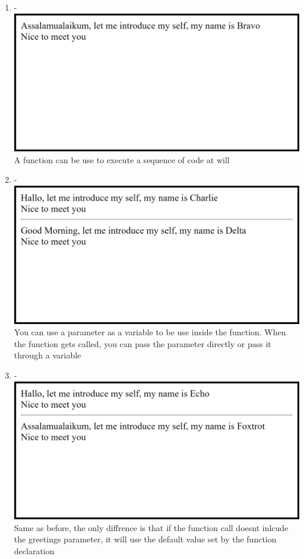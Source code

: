 \documentclass[12pt,titlepage]{article}
\begin{document}
\begin{enumerate}
    \item - \\ \includegraphics[width=.9\textwidth]{images/figures/fig4.png} \\ A function can be use to execute a sequence of code at will
    \item - \\ \includegraphics[width=.9\textwidth]{images/figures/fig5.png} \\ You can use a parameter as a variable to be use inside the function. When the function gets called, you can pass the parameter directly or pass it through a variable
    
    \newpage

    \item - \\ \includegraphics[width=.9\textwidth]{images/figures/fig6.png} \\ Same as before, the only diffrence is that if the function call doesnt inlcude the greetings parameter, it will use the default value set by the function declaration 
\end{enumerate}
\end{document}
